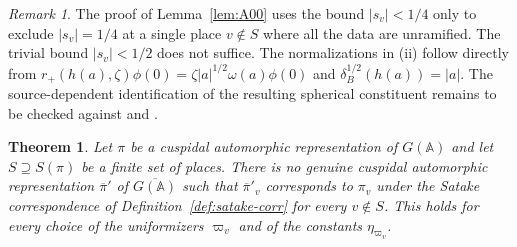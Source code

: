 \documentclass[12pt,letterpaper,openany]{book}
\theoremstyle{plain}
\newtheorem{theorem}{Theorem}[chapter]
\theoremstyle{definition}
\theoremstyle{remark}
\theoremstyle{remark}
\newtheorem{remyy}{Remark}
\begin{document}
\begin{remyy}\label{rem26:A00-norm}
The proof of Lemma~\ref{lem:A00} uses the bound $|s_v|<1/4$ only to
exclude $|s_v|=1/4$ at a single place $v\notin S$ where all the data are
unramified. The trivial bound $|s_v|<1/2$ does not suffice. The
normalizations in (ii) follow directly from
$r_+(h(a),\zeta)\phi(0)=\zeta|a|^{1/2}\omega(a)\phi(0)$
and $\delta_B^{1/2}(h(a))=|a|$.
The source-dependent identification of the resulting spherical
constituent remains to be checked against \cite{Ge2} and
\cite{GePS}.
\end{remyy}

\begin{theorem}\label{thm:nonexist}
Let $\pi$ be a cuspidal automorphic representation of $G({\mathbb A})$ and
let $S\supseteq S(\pi)$ be a finite set of places. There is no genuine
cuspidal automorphic representation $\overline\pi'$ of
$\overline{G({\mathbb A})}$ such that $\overline\pi'_v$ corresponds to
$\pi_v$ under the Satake correspondence of
Definition~\ref{def:satake-corr} for every $v\notin S$. This holds for
every choice of the uniformizers $\varpi_v$ and of the constants
$\eta_{\varpi_v}$.
\end{theorem}
\end{document}
